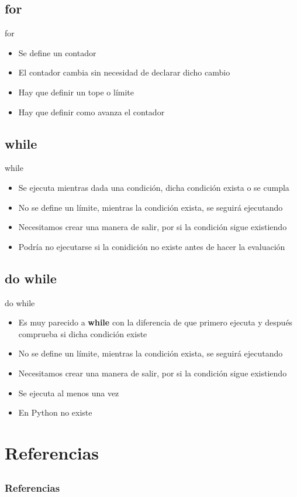 \documentclass{beamer}
\begin{document}
	\subsection{for}
	\begin{frame}{for}
		\begin{itemize}
			\item Se define un contador
			\item El contador cambia sin necesidad de declarar dicho cambio
			\item Hay que definir un tope o l\'imite
			\item Hay que definir como avanza el contador
		\end{itemize}
	\end{frame}
	
	\subsection{while}
	\begin{frame}{while}
		\begin{itemize}
			\item Se ejecuta mientras dada una condici\'on, dicha condici\'on exista o se cumpla
			\item No se define un l\'imite, mientras la condici\'on exista, se seguir\'a ejecutando 
			\item Necesitamos crear una manera de salir, por si la condici\'on sigue existiendo
			\item Podr\'ia no ejecutarse si la conidici\'on no existe antes de hacer la evaluaci\'on
		\end{itemize}
	\end{frame}
	
	\subsection{do while}
	\begin{frame}{do while}
		\begin{itemize}
			\item Es muy parecido a \textbf{while} con la diferencia de que primero ejecuta y despu\'es comprueba si dicha condici\'on existe
			\item No se define un l\'imite, mientras la condici\'on exista, se seguir\'a ejecutando
			\item Necesitamos crear una manera de salir, por si la condici\'on sigue existiendo
			\item Se ejecuta al menos una vez
			\item En Python no existe
		\end{itemize}
	\end{frame}
	
	\section{Referencias}
	\subsection{}
	\begin{frame}[allowframebreaks]
		\frametitle{Referencias}
		
		
	\end{frame}
	
	
\end{document}
